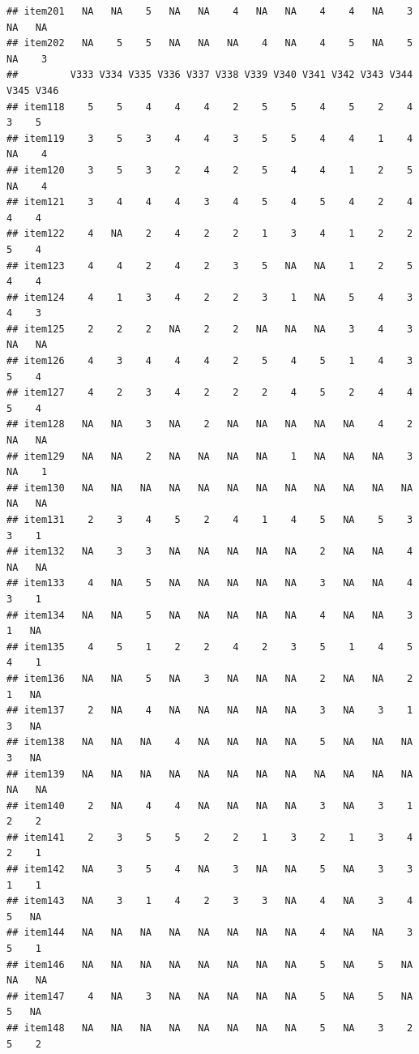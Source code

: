 \documentclass[
  man]{apa6}
\begin{document}
\begin{verbatim}
## item201   NA   NA    5   NA   NA    4   NA   NA    4    4   NA    3   NA   NA
## item202   NA    5    5   NA   NA   NA    4   NA    4    5   NA    5   NA    3
##         V333 V334 V335 V336 V337 V338 V339 V340 V341 V342 V343 V344 V345 V346
## item118    5    5    4    4    4    2    5    5    4    5    2    4    3    5
## item119    3    5    3    4    4    3    5    5    4    4    1    4   NA    4
## item120    3    5    3    2    4    2    5    4    4    1    2    5   NA    4
## item121    3    4    4    4    3    4    5    4    5    4    2    4    4    4
## item122    4   NA    2    4    2    2    1    3    4    1    2    2    5    4
## item123    4    4    2    4    2    3    5   NA   NA    1    2    5    4    4
## item124    4    1    3    4    2    2    3    1   NA    5    4    3    4    3
## item125    2    2    2   NA    2    2   NA   NA   NA    3    4    3   NA   NA
## item126    4    3    4    4    4    2    5    4    5    1    4    3    5    4
## item127    4    2    3    4    2    2    2    4    5    2    4    4    5    4
## item128   NA   NA    3   NA    2   NA   NA   NA   NA   NA    4    2   NA   NA
## item129   NA   NA    2   NA   NA   NA   NA    1   NA   NA   NA    3   NA    1
## item130   NA   NA   NA   NA   NA   NA   NA   NA   NA   NA   NA   NA   NA   NA
## item131    2    3    4    5    2    4    1    4    5   NA    5    3    3    1
## item132   NA    3    3   NA   NA   NA   NA   NA    2   NA   NA    4   NA   NA
## item133    4   NA    5   NA   NA   NA   NA   NA    3   NA   NA    4    3    1
## item134   NA   NA    5   NA   NA   NA   NA   NA    4   NA   NA    3    1   NA
## item135    4    5    1    2    2    4    2    3    5    1    4    5    4    1
## item136   NA   NA    5   NA    3   NA   NA   NA    2   NA   NA    2    1   NA
## item137    2   NA    4   NA   NA   NA   NA   NA    3   NA    3    1    3   NA
## item138   NA   NA   NA    4   NA   NA   NA   NA    5   NA   NA   NA    3   NA
## item139   NA   NA   NA   NA   NA   NA   NA   NA   NA   NA   NA   NA   NA   NA
## item140    2   NA    4    4   NA   NA   NA   NA    3   NA    3    1    2    2
## item141    2    3    5    5    2    2    1    3    2    1    3    4    2    1
## item142   NA    3    5    4   NA    3   NA   NA    5   NA    3    3    1    1
## item143   NA    3    1    4    2    3    3   NA    4   NA    3    4    5   NA
## item144   NA   NA   NA   NA   NA   NA   NA   NA    4   NA   NA    3    5    1
## item146   NA   NA   NA   NA   NA   NA   NA   NA    5   NA    5   NA   NA   NA
## item147    4   NA    3   NA   NA   NA   NA   NA    5   NA    5   NA    5   NA
## item148   NA   NA   NA   NA   NA   NA   NA   NA    5   NA    3    2    5    2

\end{verbatim}
\end{document}
